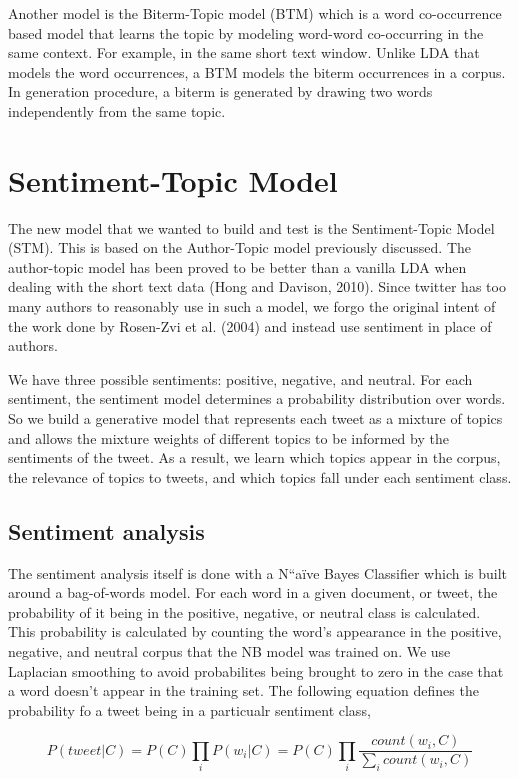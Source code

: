 \documentclass[12pt]{amsart}
\newcommand{\0}{\mat{0}}
\newcommand{\1}{\mathds{1}}
\begin{document}
Another model is the Biterm-Topic model (BTM) which is a word co-occurrence based  model that learns the topic by modeling word-word co-occurring in the same context. For example, in the same short text window. Unlike LDA that models the word occurrences, a BTM models the biterm occurrences in a corpus. In generation procedure, a biterm is generated by drawing two words independently from the same topic.

\section{Sentiment-Topic Model}

The new model that we wanted to build and test is the Sentiment-Topic Model (STM). This is based on the Author-Topic model previously discussed. The author-topic model has been proved to be better than a vanilla LDA when dealing with the short text data (Hong and Davison, 2010). Since twitter has too many authors to reasonably use in such a model, we forgo the original intent of the work done by Rosen-Zvi et al. (2004) and instead use sentiment in place of authors. 

We have three possible sentiments: positive, negative, and neutral. For each sentiment, the sentiment model determines a probability distribution over words. So we build a generative model that represents each tweet as a mixture of topics and allows the mixture weights of different topics to be informed by the sentiments of the tweet. As a result, we learn which topics appear in the corpus, the relevance of topics to tweets, and which topics fall under each sentiment class.

\subsection{Sentiment analysis}
The sentiment analysis itself is done with a N``a\"ive Bayes Classifier which is built around a bag-of-words model. For each word in a given document, or tweet, the probability of it being in the positive, negative, or neutral class is calculated. This probability is calculated by counting the word's appearance in the positive, negative, and neutral corpus that the NB model was trained on. We use Laplacian smoothing to avoid probabilites being brought to zero in the case that a word doesn't appear in the training set. 
The following equation defines the probability fo a tweet being in a particualr sentiment class,

$$ P(tweet| C) = P(C) \prod_i P(w_i | C) = P(C) \prod_i \frac{count(w_i, C)}{\sum_i count(w_i, C)}$$
\end{document}
